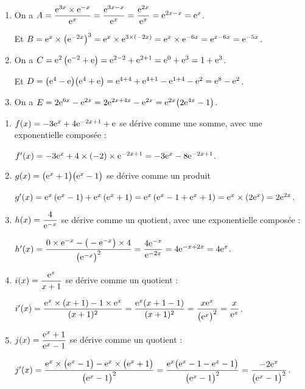 \documentclass[a4paper,11pt]{article}
\begin{document}
\medskip



\begin{enumerate}
	\item On a $A=\dfrac{{\rm e}^{3x} \times {\rm e}^{-x}}{{\rm e}^x}=\dfrac{{\rm e}^{3x-x}}{{\rm e}^x}=\dfrac{{\rm e}^{2x}}{{\rm e}^x}={\rm e}^{2x-x} = {\rm e}^{x}$.
	
	Et $B={\rm e}^x \times \big({\rm e}^{-2x}\big)^3 = {\rm e}^x \times {\rm e}^{3 \times (-2x)} = {\rm e}^x \times {\rm e}^{-6x} = {\rm e}^{x-6x} = {\rm e}^{-5x}$.
	\item On a $C={\rm e}^2\left({\rm e}^{-2}+{\rm e}\right) = {\rm e}^{2-2} + {\rm e}^{2+1} = {\rm e}^0 + {\rm e}^3 = 1 + {\rm e}^3$.
	
	Et $D=\big({\rm e}^4-{\rm e}\big)\big({\rm e}^4+{\rm e}\big) = {\rm e}^{4+4}+{\rm e}^{4+1}-{\rm e}^{1+4}-{\rm e}^2 = {\rm e}^8 - {\rm e}^2$.
	\item On a $E=2{\rm e}^{6x}-{\rm e}^{2x} = 2{\rm e}^{2x+4x} - {\rm e}^{2x} = {\rm e}^{2x} \big(2{\rm e}^{4x}-1\big)$.
\end{enumerate}

\medskip


\begin{enumerate}
	\item $f(x)=-3{\rm e}^x+4{\rm e}^{-2x+1}+{\rm e}$ se dérive comme une somme, avec une exponentielle composée :
	
	\hspace{5mm}$f'(x)=-3{\rm e}^x + 4 \times (-2) \times {\rm e}^{-2x+1} = -3{\rm e}^x - 8{\rm e}^{-2x+1}$.
	\item $g(x)=\big({\rm e}^x+1\big)\big({\rm e}^x-1\big)$ se dérive comme un produit
	
	\hspace{5mm}$g'(x)= {\rm e}^x \left({\rm e}^x-1\right) + {\rm e}^x \left({\rm e}^x+1\right) = {\rm e}^x \left( {\rm e}^x-1+{\rm e}^x+1 \right) = {\rm e}^x \times \left(2{\rm e}^x\right) = 2{\rm e}^{2x}$.
	\item $h(x)=\dfrac{4}{{\rm e}^{-x}}$ se dérive comme un quotient, avec une exponentielle composée :
	
	\hspace{5mm}$h'(x)=\dfrac{0 \times {\rm e}^{-x} - \big(-{\rm e}^{-x}\big) \times 4}{\big({\rm e}^{-x}\big)^2} = \dfrac{4{\rm e}^{-x}}{{\rm e}^{-2x}}=4{\rm e}^{-x+2x}=4{\rm e}^{x}$.
	\item $i(x)=\dfrac{{\rm e}^x}{x+1}$ se dérive comme un quotient :
	
	\hspace{5mm}$i'(x)=\dfrac{{\rm e}^x \times (x+1) - 1 \times {\rm e}^x}{(x+1)^2}=\dfrac{{\rm e}^x(x+1-1)}{(x+1)^2}=\dfrac{x{\rm e}^x}{\big({\rm e}^x\big)^2} = \dfrac{x}{{\rm e}^x}$.
	\item $j(x)=\dfrac{{\rm e}^x+1}{{\rm e}^x-1}$ se dérive comme un quotient :
	
	\hspace{5mm}$j'(x)=\dfrac{{\rm e}^x \times \big({\rm e}^x-1\big)-{\rm e}^x \times \big({\rm e}^x+1\big)}{\big({\rm e}^x-1\big)^2}=\dfrac{{\rm e}^x \big( {\rm e}^x-1-{\rm e}^x-1\big)}{\big({\rm e}^x-1\big)^2} = \dfrac{-2{\rm e}^x}{\big({\rm e}^x-1\big)^2}$.
\end{enumerate}
\end{document}

